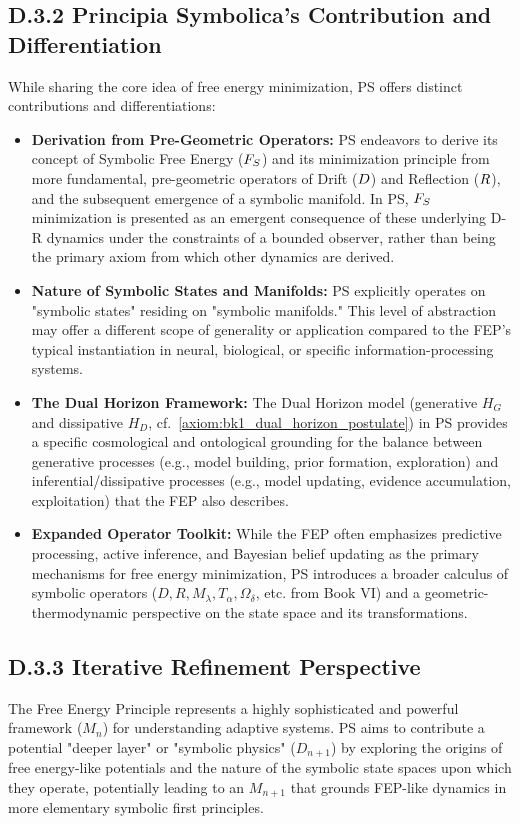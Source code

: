 \subsection*{D.3.2 Principia Symbolica's Contribution and Differentiation} \label{subsec:appD_fep_contribution_differentiation}
While sharing the core idea of free energy minimization, PS offers distinct contributions and differentiations:
\begin{itemize}
    \item \textbf{Derivation from Pre-Geometric Operators:} PS endeavors to derive its concept of Symbolic Free Energy (\(F_S\)) and its minimization principle from more fundamental, pre-geometric operators of Drift (\(D\)) and Reflection (\(R\)), and the subsequent emergence of a symbolic manifold. In PS, \(F_S\) minimization is presented as an emergent consequence of these underlying D-R dynamics under the constraints of a bounded observer, rather than being the primary axiom from which other dynamics are derived.
    \item \textbf{Nature of Symbolic States and Manifolds:} PS explicitly operates on "symbolic states" residing on "symbolic manifolds." This level of abstraction may offer a different scope of generality or application compared to the FEP's typical instantiation in neural, biological, or specific information-processing systems.
    \item \textbf{The Dual Horizon Framework:} The Dual Horizon model (generative \(H_G\) and dissipative \(H_D\), cf.~\ref{axiom:bk1_dual_horizon_postulate}) in PS provides a specific cosmological and ontological grounding for the balance between generative processes (e.g., model building, prior formation, exploration) and inferential/dissipative processes (e.g., model updating, evidence accumulation, exploitation) that the FEP also describes.
    \item \textbf{Expanded Operator Toolkit:} While the FEP often emphasizes predictive processing, active inference, and Bayesian belief updating as the primary mechanisms for free energy minimization, PS introduces a broader calculus of symbolic operators (\(D, R, M_\lambda, T_\alpha, \Omega_\delta\), etc. from Book VI) and a geometric-thermodynamic perspective on the state space and its transformations.
\end{itemize}
\subsection*{D.3.3 Iterative Refinement Perspective}
\label{subsec:appD_fep_iterative_refinement_perspective}
The Free Energy Principle represents a highly sophisticated and powerful framework (\(M_n\)) for understanding adaptive systems. PS aims to contribute a potential "deeper layer" or "symbolic physics" (\(D_{n+1}\)) by exploring the origins of free energy-like potentials and the nature of the symbolic state spaces upon which they operate, potentially leading to an \(M_{n+1}\) that grounds FEP-like dynamics in more elementary symbolic first principles.
